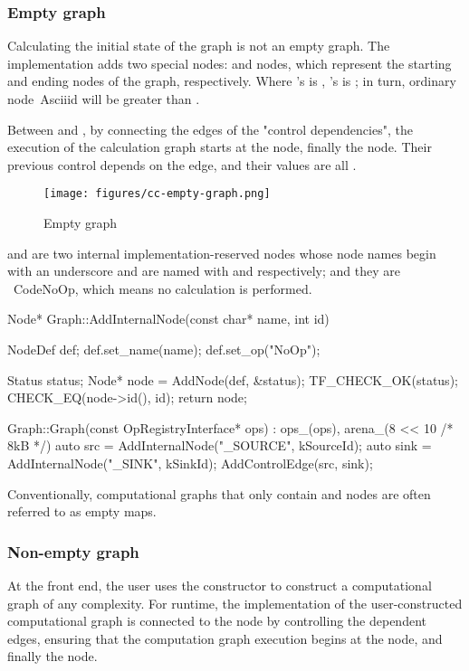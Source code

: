 \begin{content}
\subsubsection{Empty graph}
Calculating the initial state of the graph is not an empty graph. The implementation adds two special nodes:  and  nodes, which represent the starting and ending nodes of the  graph, respectively. Where 's  is , 's  is ; in turn, ordinary node\ Ascii{id} will be greater than .

Between  and , by connecting the edges of the "control dependencies", the execution of the calculation graph starts at the  node, finally the  node. Their previous control depends on the edge, and their  values ​​are all .

\begin{figure}[H]
  \centering
  \texttt{[image: figures/cc-empty-graph.png]}
  \caption{Empty graph}
  \label{fig:cc-empty-graph}
\end{figure}

 and  are two internal implementation-reserved nodes whose node names begin with an underscore and are named with  and  respectively; and they are \ Code{NoOp}, which means no calculation is performed.

\begin{leftbar}
\begin{c++}
Node* Graph::AddInternalNode(const char* name, int id) {
  NodeDef def;
  def.set_name(name);
  def.set_op("NoOp");

  Status status;
  Node* node = AddNode(def, &status);
  TF_CHECK_OK(status);
  CHECK_EQ(node->id(), id);
  return node;
}

Graph::Graph(const OpRegistryInterface* ops)
    : ops_(ops), arena_(8 << 10 /* 8kB */) {
  auto src  = AddInternalNode("_SOURCE", kSourceId);
  auto sink = AddInternalNode("_SINK",   kSinkId);
  AddControlEdge(src, sink);
}
\end{c++}
\end{leftbar}

Conventionally, computational graphs that only contain  and  nodes are often referred to as empty maps.


\subsubsection{Non-empty graph}
At the front end, the user uses the  constructor to construct a computational graph of any complexity. For runtime, the implementation of the user-constructed computational graph is connected to the  node by controlling the dependent edges, ensuring that the computation graph execution begins at the  node, and finally the  node.


\end{content}
